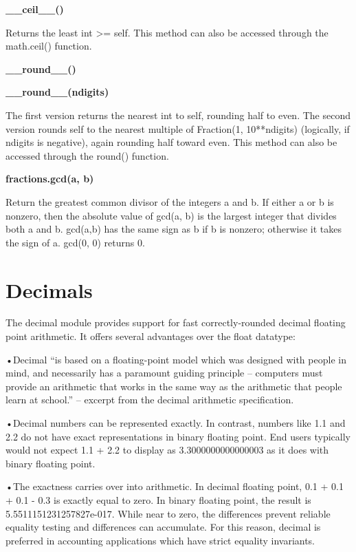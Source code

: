 \vpara
\textbf{\_\_ceil\_\_()}

Returns the least int >= self. This method can also be accessed through the math.ceil() function.

\vpara
\textbf{\_\_round\_\_()}

\textbf{\_\_round\_\_(ndigits)}

The first version returns the nearest int to self, rounding half to even. The second version rounds self to the nearest multiple of Fraction(1, 10**ndigits) (logically, if ndigits is negative), again rounding half toward even. This method can also be accessed through the round() function.

\vpara
\textbf{fractions.gcd(a, b)}

Return the greatest common divisor of the integers a and b. If either a or b is nonzero, then the absolute value of gcd(a, b) is the largest integer that divides both a and b. gcd(a,b) has the same sign as b if b is nonzero; otherwise it takes the sign of a. gcd(0, 0) returns 0.



\section{Decimals}

The decimal module provides support for fast correctly-rounded decimal floating point arithmetic. It offers several advantages over the float datatype:

•Decimal “is based on a floating-point model which was designed with people in mind, and necessarily has a paramount guiding principle – computers must provide an arithmetic that works in the same way as the arithmetic that people learn at school.” – excerpt from the decimal arithmetic specification.


•Decimal numbers can be represented exactly. In contrast, numbers like 1.1 and 2.2 do not have exact representations in binary floating point. End users typically would not expect 1.1 + 2.2 to display as 3.3000000000000003 as it does with binary floating point.


•The exactness carries over into arithmetic. In decimal floating point, 0.1 + 0.1 + 0.1 - 0.3 is exactly equal to zero. In binary floating point, the result is 5.5511151231257827e-017. While near to zero, the differences prevent reliable equality testing and differences can accumulate. For this reason, decimal is preferred in accounting applications which have strict equality invariants.


